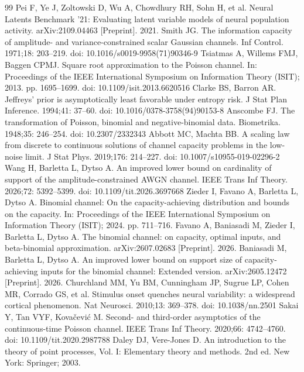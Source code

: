 \begin{thebibliography}{99}
 Pei F, Ye J, Zoltowski D, Wu A, Chowdhury RH, Sohn H, et al. Neural Latents Benchmark '21: Evaluating latent variable models of neural population activity. arXiv:2109.04463 [Preprint]. 2021.
 Smith JG. The information capacity of amplitude- and variance-constrained scalar Gaussian channels. Inf Control. 1971;18: 203--219. doi: 10.1016/s0019-9958(71)90346-9
 Tsiatmas A, Willems FMJ, Baggen CPMJ. Square root approximation to the Poisson channel. In: Proceedings of the IEEE International Symposium on Information Theory (ISIT); 2013. pp. 1695--1699. doi: 10.1109/isit.2013.6620516
 Clarke BS, Barron AR. Jeffreys' prior is asymptotically least favorable under entropy risk. J Stat Plan Inference. 1994;41: 37--60. doi: 10.1016/0378-3758(94)90153-8
 Anscombe FJ. The transformation of Poisson, binomial and negative-binomial data. Biometrika. 1948;35: 246--254. doi: 10.2307/2332343
 Abbott MC, Machta BB. A scaling law from discrete to continuous solutions of channel capacity problems in the low-noise limit. J Stat Phys. 2019;176: 214--227. doi: 10.1007/s10955-019-02296-2
 Wang H, Barletta L, Dytso A. An improved lower bound on cardinality of support of the amplitude-constrained AWGN channel. IEEE Trans Inf Theory. 2026;72: 5392--5399. doi: 10.1109/tit.2026.3697668
 Zieder I, Favano A, Barletta L, Dytso A. Binomial channel: On the capacity-achieving distribution and bounds on the capacity. In: Proceedings of the IEEE International Symposium on Information Theory (ISIT); 2024. pp. 711--716.
 Favano A, Baniasadi M, Zieder I, Barletta L, Dytso A. The binomial channel: on capacity, optimal inputs, and beta-binomial approximation. arXiv:2607.02683 [Preprint]. 2026.
 Baniasadi M, Barletta L, Dytso A. An improved lower bound on support size of capacity-achieving inputs for the binomial channel: Extended version. arXiv:2605.12472 [Preprint]. 2026.
 Churchland MM, Yu BM, Cunningham JP, Sugrue LP, Cohen MR, Corrado GS, et al. Stimulus onset quenches neural variability: a widespread cortical phenomenon. Nat Neurosci. 2010;13: 369--378. doi: 10.1038/nn.2501
 Sakai Y, Tan VYF, Kovačević M. Second- and third-order asymptotics of the continuous-time Poisson channel. IEEE Trans Inf Theory. 2020;66: 4742--4760. doi: 10.1109/tit.2020.2987788
 Daley DJ, Vere-Jones D. An introduction to the theory of point processes, Vol. I: Elementary theory and methods. 2nd ed. New York: Springer; 2003.

\end{thebibliography}
